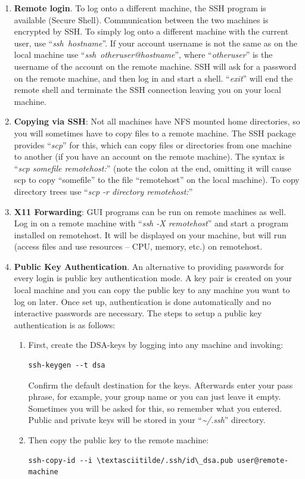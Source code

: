 \begin{enumerate}
\item
  \textbf{Remote login}. To log onto a different machine, the SSH
  program is available (Secure Shell). Communication between the two
  machines is encrypted by SSH. To simply log onto a different machine
  with the current user, use ``\emph{ssh~hostname}''. If your account
  username is not the same as on the local machine use
  ``\emph{ssh~otheruser@hostname}'', where ``\emph{otheruser}'' is the
  username of the account on the remote machine. SSH will ask for a
  password on the remote machine, and then log in and start a shell.
  ``\emph{exit}'' will end the remote shell and terminate the SSH
  connection leaving you on your local machine.
\item
  \textbf{Copying via SSH}: Not all machines have NFS mounted home
  directories, so you will sometimes have to copy files to a remote
  machine. The SSH package provides ``\emph{scp}'' for this, which can
  copy files or directories from one machine to another (if you have an
  account on the remote machine). The syntax is ``\emph{scp somefile
  remotehost:}'' (note the colon at the end, omitting it will cause scp
  to copy ``somefile'' to the file ``remotehost'' on the local machine).
  To copy directory trees use ``\emph{scp -r directory remotehost:}''
\item
  \textbf{X11 Forwarding}: GUI programs can be run on remote machines as
  well. Log in on a remote machine with ``\emph{ssh -X remotehost}'' and
  start a program installed on remotehost. It will be displayed on your
  machine, but will run (access files and use resources -- CPU, memory,
  etc.) on remotehost.
\item
  \textbf{Public Key Authentication}. An alternative to providing
  passwords for every login is public key authentication mode. A key
  pair is created on your local machine and you can copy the public key
  to any machine you want to log on later. Once set up, authentication
  is done automatically and no interactive passwords are necessary. The
  steps to setup a public key authentication is as follows:

  \begin{enumerate}
  \def\labelenumii{\roman{enumii}.}
  \item
    First, create the DSA-keys by logging into any machine and invoking:
\begin{lstlisting}
ssh-keygen --t dsa
\end{lstlisting}
Confirm the default destination for the keys. Afterwards enter your pass
phrase, for example, your group name or you can just leave it empty.
Sometimes you will be asked for this, so remember what you entered.
Public and private keys will be stored in your
``\emph{\textasciitilde/.ssh}'' directory.
\item
  Then copy the public key to the remote machine:
\begin{lstlisting}
ssh-copy-id --i \textasciitilde/.ssh/id\_dsa.pub user@remote-machine
\end{lstlisting}
\end{enumerate}
\end{enumerate}
